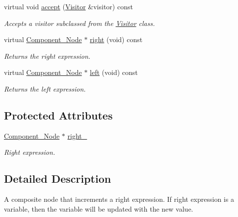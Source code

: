 \begin{DoxyCompactItemize}
virtual void \hyperlink{classMadara_1_1Expression__Tree_1_1Composite__Preincrement__Node_ae677ce316231e55c363c817de8a6cfe2}{accept} (\hyperlink{classMadara_1_1Expression__Tree_1_1Visitor}{Visitor} \&visitor) const 
\begin{DoxyCompactList}\small\item\em Accepts a visitor subclassed from the \hyperlink{classMadara_1_1Expression__Tree_1_1Visitor}{Visitor} class. \item\end{DoxyCompactList}\item 
virtual \hyperlink{classMadara_1_1Expression__Tree_1_1Component__Node}{Component\_\-Node} $\ast$ \hyperlink{classMadara_1_1Expression__Tree_1_1Composite__Unary__Node_ade55cde5707e0fa73ab1c019159b9aec}{right} (void) const 
\begin{DoxyCompactList}\small\item\em Returns the right expression. \item\end{DoxyCompactList}\item 
virtual \hyperlink{classMadara_1_1Expression__Tree_1_1Component__Node}{Component\_\-Node} $\ast$ \hyperlink{classMadara_1_1Expression__Tree_1_1Component__Node_abe0c7474f1af4cb06d06ab13479a89db}{left} (void) const 
\begin{DoxyCompactList}\small\item\em Returns the left expression. \item\end{DoxyCompactList}\end{DoxyCompactItemize}
\subsection*{Protected Attributes}
\begin{DoxyCompactItemize}
\item 
\hyperlink{classMadara_1_1Expression__Tree_1_1Component__Node}{Component\_\-Node} $\ast$ \hyperlink{classMadara_1_1Expression__Tree_1_1Composite__Unary__Node_a077b7bd1b52df6f5c6adfde735556a68}{right\_\-}
\begin{DoxyCompactList}\small\item\em Right expression. \item\end{DoxyCompactList}\end{DoxyCompactItemize}


\subsection{Detailed Description}
A composite node that increments a right expression. If right expression is a variable, then the variable will be updated with the new value. 

